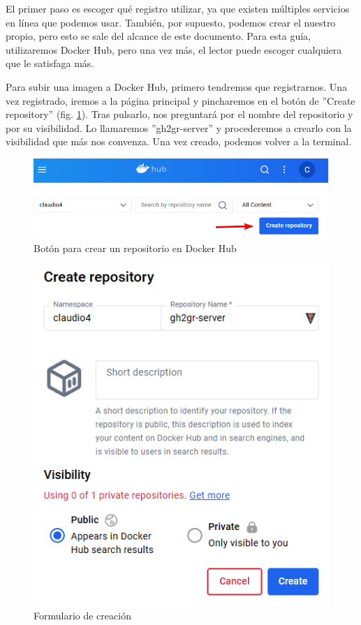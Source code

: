 El primer paso es escoger qué registro utilizar, ya que existen múltiples servicios en línea que podemos usar. También, por supuesto, podemos crear el nuestro propio, pero esto se sale del alcance de este documento. Para esta guía, utilizaremos Docker Hub, pero una vez más, el lector puede escoger cualquiera que le satisfaga más.

Para subir una imagen a Docker Hub, primero tendremos que registrarnos. Una vez registrado, iremos a la página principal y pincharemos en el botón de ''Create repository'' (fig. \ref{fig:docker-hub-create}). Tras pulsarlo, nos preguntará por el nombre del repositorio y por su visibilidad. Lo llamaremos ''gh2gr-server'' y procederemos a crearlo con la visibilidad que más nos convenza. Una vez creado, podemos volver a la terminal.

\begin{figure}
    \centering
    \includegraphics[width=0.75\linewidth]{images/docker-hub-create.png}
    \caption{Botón para crear un repositorio en Docker Hub}
    \label{fig:docker-hub-create}
\end{figure}

\begin{figure}
    \centering
    \includegraphics[width=0.75\linewidth]{images/ducker-hub-form.png}
    \caption{Formulario de creación }
\end{figure}

